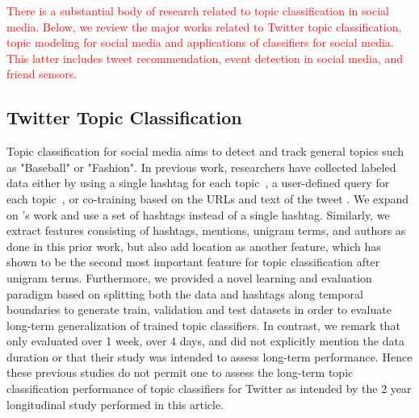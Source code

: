 %
%
%
%
%

\textcolor{red}{There is a substantial body of research related to topic classification in social media. Below, we review the major works related to Twitter topic classification, topic modeling for social media and  applications of classifiers for social media. This latter includes tweet recommendation, event detection in social media, and friend sensors.
}

\subsection*{Twitter Topic Classification} 

Topic classification for social media aims to detect and track general topics such as "Baseball" or "Fashion".  In previous work, researchers have collected labeled data either by using a single hashtag for each topic~\citep{lin2011smoothing}, a user-defined query for each topic~\citep{magdy}, or co-training based on the URLs and text of the tweet \citep{yang2014large}.
We expand on \citep{lin2011smoothing}'s work and use a set of hashtags instead of a single hashtag.  Similarly, we extract features consisting of hashtags, mentions, unigram terms, and authors as done in this prior work, but also add location as another feature, which has shown to be the second most important feature for topic classification after unigram terms.
Furthermore, we provided a novel learning and evaluation paradigm based on splitting both the data and hashtags along temporal boundaries to generate train, validation and test datasets in order to evaluate long-term generalization of trained topic classifiers.  In contrast, we remark that \citep{lin2011smoothing} only evaluated over 1 week, \citep{magdy} over 4 days,
and \citep{yang2014large} did not explicitly mention the data duration or that their study was intended to assess long-term performance.  Hence these previous studies do not permit one to assess the long-term topic classification performance of topic classifiers for Twitter as intended by the 2 year longitudinal study performed in this article.

